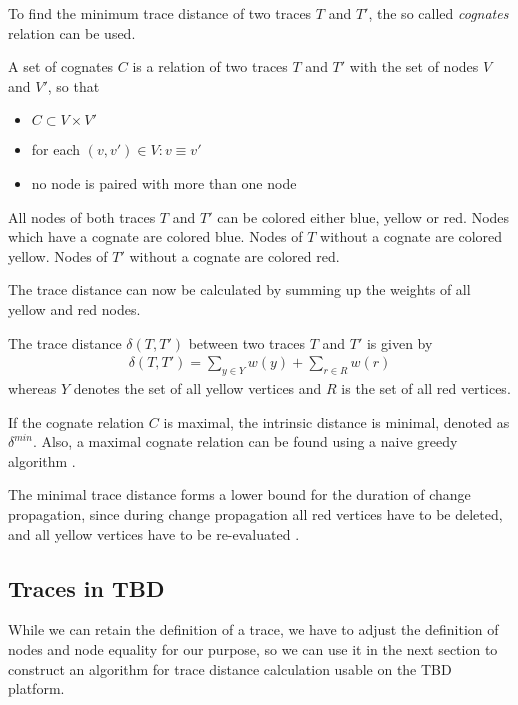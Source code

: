 To find the minimum trace distance of two traces $T$ and $T'$, the so called \textit{cognates} relation can be used. 

\begin{definition}[Cognates]
A set of cognates $C$ is a relation of two traces $T$ and $T'$ with the set of nodes $V$ and $V'$, so that

\begin{itemize}
\item $C \subset V \times V'$
\item for each $(v, v') \in V: v \equiv v'$ 
\item no node is paired with more than one node
\end{itemize}
\end{definition}
All nodes of both traces $T$ and $T'$ can be colored either blue, yellow or red. 
Nodes which have a cognate are colored blue. Nodes of $T$ without a cognate are colored yellow. Nodes of $T'$ without a cognate are colored red. 

The trace distance can now be calculated by summing up the weights of all yellow and red nodes. 

\begin{definition}
The trace distance $\delta(T, T')$ between two traces $T$ and $T'$ is given by
\begin{align*}
  \delta(T, T') = \sum_{y \in Y} w(y) + \sum_{r \in R} w(r)
\end{align*}
whereas $Y$ denotes the set of all yellow vertices and $R$ is the set of all red vertices. 
\end{definition}

If the cognate relation $C$ is maximal, the intrinsic distance is minimal, denoted as $\delta^{min}$. Also, a maximal cognate relation can be found using a naive greedy algorithm \cite{Acar2005thesis} \cite{acar2004dynamizing}.

The minimal trace distance forms a lower bound for the duration of change propagation, since during change propagation all red vertices have to be deleted, and all yellow vertices have to be re-evaluated \cite{Acar2005thesis}.

\subsection{Traces in TBD}

While we can retain the definition of a trace, we have to adjust the definition of nodes and node equality for our purpose, so we can use it in the next section to construct an algorithm for trace distance calculation usable on the TBD platform. 

